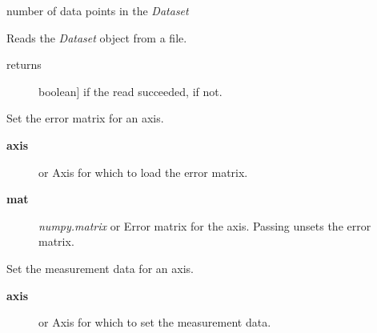 \documentclass[a4paper,10pt,english]{sphinxmanual}
\begin{document}
\begin{fulllineitems}
\begin{fulllineitems}
\end{fulllineitems}


\begin{fulllineitems}
\label{index:kafe.dataset.Dataset.n_datapoints}
number of data points in the \emph{Dataset}

\end{fulllineitems}


\begin{fulllineitems}
\label{index:kafe.dataset.Dataset.read_from_file}
Reads the \emph{Dataset} object from a file.
\begin{description}
\item[{returns}] \leavevmode{[}boolean{]}
 if the read succeeded,  if not.

\end{description}

\end{fulllineitems}


\begin{fulllineitems}
\label{index:kafe.dataset.Dataset.set_cov_mat}
Set the error matrix for an axis.
\begin{description}
\item[{\textbf{axis}}] \leavevmode{[} or \code{'y'}{]}
Axis for which to load the error matrix.

\item[{\textbf{mat}}] \leavevmode{[}\emph{numpy.matrix} or \code{None}{]}
Error matrix for the axis. Passing  unsets the error matrix.

\end{description}

\end{fulllineitems}


\begin{fulllineitems}
\label{index:kafe.dataset.Dataset.set_data}
Set the measurement data for an axis.
\begin{description}
\item[{\textbf{axis}}] \leavevmode{[} or \code{'y'}{]}
Axis for which to set the measurement data.


\end{description}
\end{fulllineitems}
\end{fulllineitems}
\end{document}
